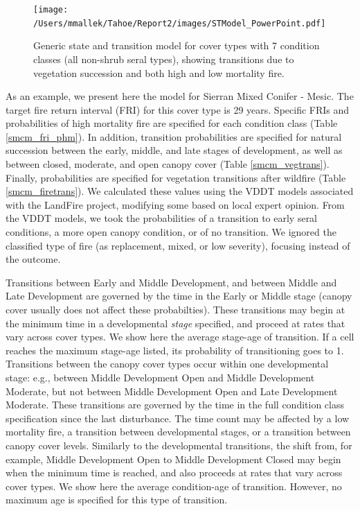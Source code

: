 \begin{figure}[htbp]
\centering
\texttt{[image: /Users/mmallek/Tahoe/Report2/images/STModel\_PowerPoint.pdf]}
\caption{Generic state and transition model for cover types with 7 condition classes (all non-shrub seral types), showing transitions due to vegetation succession and both high and low mortality fire.} 
\label{transmodel}
\end{figure}

As an example, we present here the model for Sierran Mixed Conifer - Mesic. The target fire return interval (FRI) for this cover type is 29 years. Specific FRIs and probabilities of high mortality fire are specified for each condition class (Table \ref{smcm_fri_phm}). In addition, transition probabilities are specified for natural succession between the early, middle, and late stages of development, as well as between closed, moderate, and open canopy cover (Table \ref{smcm_vegtrans}). Finally, probabilities are specified for vegetation transitions after wildfire (Table \ref{smcm_firetrans}). We calculated these values using the VDDT models associated with the LandFire project, modifying some based on local expert opinion. From the VDDT models, we took the probabilities of a transition to early seral conditions, a more open canopy condition, or of no transition. We ignored the classified type of fire (as replacement, mixed, or low severity), focusing instead of the outcome.

Transitions between Early and Middle Development, and between Middle and Late Development are governed by the time in the Early or Middle stage (canopy cover usually does not affect these probabilties). These transitions may begin at the minimum time in a developmental \emph{stage} specified, and proceed at rates that vary across cover types. We show here the average stage-age of transition. If a cell reaches the maximum stage-age listed, its probability of transitioning goes to 1. Transitions between the canopy cover types occur within one developmental stage: e.g., between Middle Development Open and Middle Development Moderate, but not between Middle Development Open and Late Development Moderate. These transitions are governed by the time in the full condition class specification since the last disturbance. The time count may be affected by a low mortality fire, a transition between developmental stages, or a transition between canopy cover levels. Similarly to the developmental transitions, the shift from, for example, Middle Development Open to Middle Development Closed may begin when the minimum time is reached, and also proceeds at rates that vary across cover types. We show here the average condition-age of transition. However, no maximum age is specified for this type of transition.

